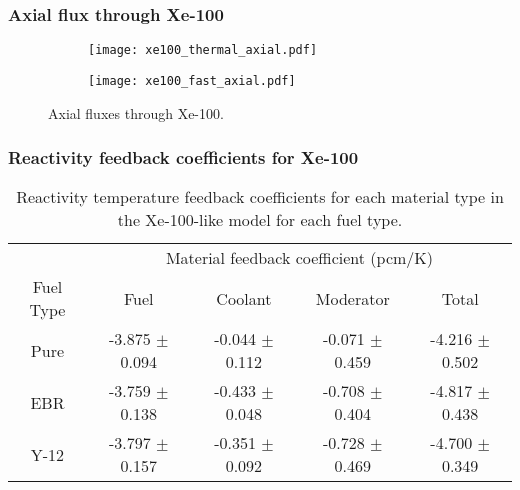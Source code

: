 \begin{frame}
    \frametitle{Axial flux through Xe-100}
    \begin{figure}
        \centering 
        \begin{subfigure}{0.49\textwidth}
            \texttt{[image: xe100\_thermal\_axial.pdf]}
        \end{subfigure}
        \begin{subfigure}{0.49\textwidth}
            \texttt{[image: xe100\_fast\_axial.pdf]}
        \end{subfigure}
        \caption{Axial fluxes through Xe-100.}
        \label{fig:xe100-axial-flux}
    \end{figure}
\end{frame}

\begin{frame}
    \frametitle{Reactivity feedback coefficients for Xe-100}
    \begin{table}[ht]
        \centering
        \caption{Reactivity temperature feedback coefficients for 
        each material type in the Xe-100-like model for each fuel 
        type.}
        \label{tab:coeff_xe100}
        \begin{tabular}{c c c c c}
            \hline 
            & \multicolumn{4}{c}{Material feedback coefficient (pcm/K)} \\
            Fuel Type & Fuel & Coolant & Moderator & Total \\
            \hline
            Pure & -3.875 $\pm$ 0.094 & -0.044 $\pm$ 0.112 & -0.071 $\pm$ 0.459 & -4.216 $\pm$ 0.502\\
            \gls{EBR} & -3.759 $\pm$ 0.138 & -0.433 $\pm$ 0.048 & -0.708 $\pm$ 0.404 & -4.817 $\pm$ 0.438\\
            Y-12 & -3.797 $\pm$ 0.157 & -0.351 $\pm$ 0.092 & -0.728 $\pm$ 0.469 & -4.700 $\pm$ 0.349\\
            \hline

        \end{tabular}
\end{table}
\end{frame}